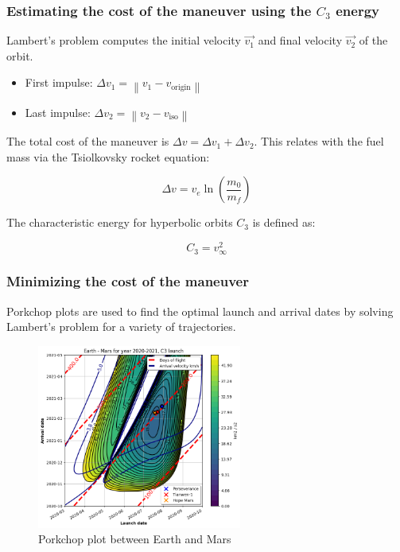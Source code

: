 \documentclass[xcolor={dvipsnames}]{beamer}
\begin{document}
\begin{frame}
\frametitle{Estimating the cost of the maneuver using the $C_3$ energy}

Lambert's problem computes the initial velocity $\vec{v_1}$ and final velocity
$\vec{v_2}$ of the orbit.

\vspace{0.25cm}
    \begin{itemize}
        \item First impulse: $\Delta v_1 = \left \|  v_{1} - v_{\text{origin}} \right \|$
        \item Last impulse: $\Delta v_2 = \left \|  v_{2} - v_{\text{iso}} \right \|$
    \end{itemize}
\vspace{0.25cm}

\pause
The total cost of the maneuver is $\Delta v = \Delta v_1 + \Delta v_2$. This
relates with the fuel mass via the Tsiolkovsky rocket equation:

$$ \Delta v = v_{e} \ln \left( \frac{m_0}{m_f} \right) $$

\pause
\vspace{0.25cm}
The characteristic energy for hyperbolic orbits $C_3$ is defined as:

$$ C_3 = v_{\infty}^2 $$

\end{frame}

\begin{frame}
\frametitle{Minimizing the cost of the maneuver}

Porkchop plots are used to find the optimal launch and arrival dates by solving
Lambert's problem for a variety of trajectories.

\pause

\begin{figure}[h]
    \centering
    \includegraphics[width=0.6\textwidth]{fig/static/porkchop.png}
    \caption{Porkchop plot between Earth and Mars}
    \label{fig:porkchop}
\end{figure}

\end{frame}
\end{document}
